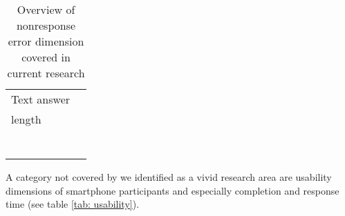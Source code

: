 \begin{table}
\begin{tabular}{ll}
    	Text answer & \cite{wells_comparison_2014, mavletova_data_2013}\\
    	length & \cite{antoun_effects_2017, lambert_living_2015}\\
    	& \cite{buskirk_making_2014}\\
    	& \cite{schlosser_mobile_2018}\\
    	& \cite{zou_mobile_2021, revilla_open_2016}\\
    	& \cite{toepoel_probing_2021}\\
    	& \cite{struminskaya_effects_2015}\\
    	& \cite{lugtig_use_2016}\\
    	& \cite{toepoel_what_2014}\\
    	\bottomrule
    \end{tabular}
	\caption{Overview of nonresponse error dimension covered in current research}
	\label{tab: nonresponse}
\end{table}

A category not covered by \cite{biemer_total_2010} we identified as a vivid research area are usability dimensions of smartphone participants and especially completion and response time (see table \ref{tab: usability}).

